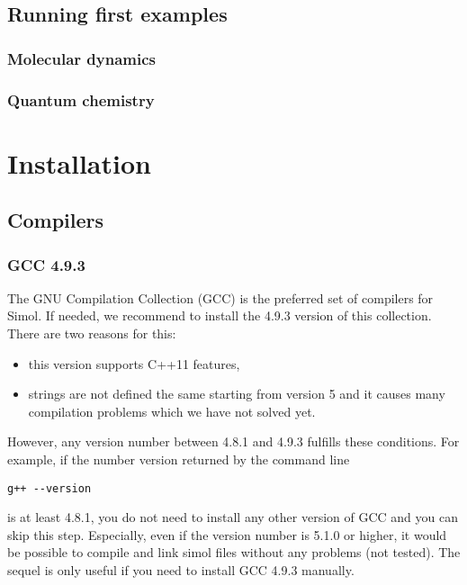 \documentclass[12pt]{book}
\begin{document}
\section{Running first examples}

\subsection{Molecular dynamics}

\subsection{Quantum chemistry}


\chapter{Installation}


\section{Compilers}

\subsection{GCC 4.9.3}

The GNU Compilation Collection (GCC) is the preferred set of compilers for Simol. If needed, we recommend to install the 4.9.3 version of this collection. There are two reasons for this:
\begin{itemize}
\item this version supports C++11 features,
\item strings are not defined the same starting from version 5 and it causes many compilation problems which we have not solved yet.
\end{itemize}
However, any version number between 4.8.1 and 4.9.3 fulfills these conditions. For example, if the number version returned by the command line
\lstset{language=bash} 
\begin{lstlisting}
g++ --version
\end{lstlisting}
is at least 4.8.1, you do not need to install any other version of GCC and you can skip this step. Especially, even if the version number is 5.1.0 or higher, it would be possible to compile and link simol files without any problems (not tested). The sequel is only useful if you need to install GCC 4.9.3 manually. 
\end{document}
